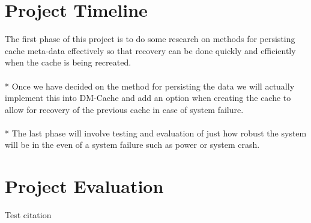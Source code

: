 \documentclass[letterpaper,12pt]{article}
\begin{document}

\section*{Project Timeline}

The first phase of this project is to do some research on methods for
persisting cache meta-data effectively so that recovery can be done
quickly and efficiently when the cache is being recreated. \\ \\*
%
Once we have decided on the method for persisting the data we will
actually implement this into DM-Cache and add an option when creating
the cache to allow for recovery of the previous cache in case of
system failure. \\ \\*
%
The last phase will involve testing and evaluation of just how robust
the system will be in the even of a system failure such as power or
system crash.


\section*{Project Evaluation}

Test citation \cite{Test}





\end{document}

